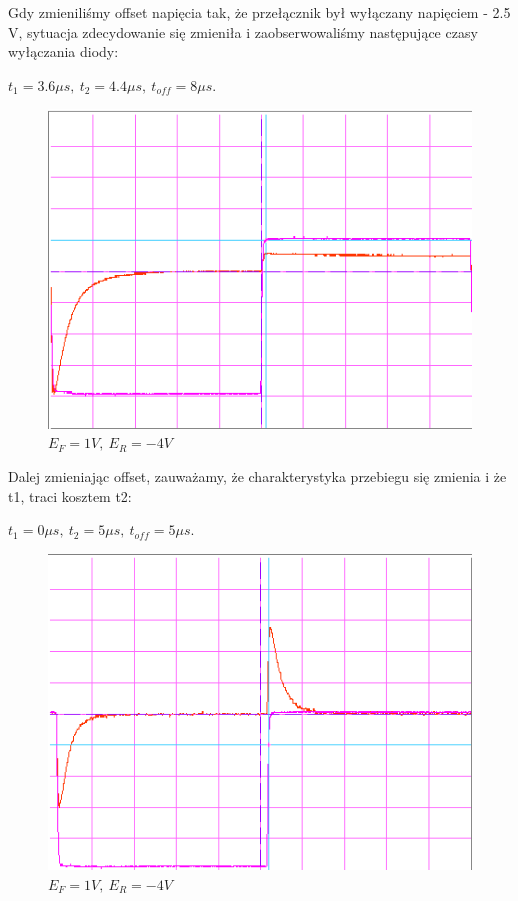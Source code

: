 \documentclass[a4paper,11pt]{article}
\begin{document}
Gdy zmieniliśmy offset napięcia tak, że przełącznik był wyłączany napięciem - 2.5 V, sytuacja zdecydowanie się zmieniła i zaobserwowaliśmy następujące czasy wyłączania diody:

 \(t_1 = 3.6 \mu s,\ t_2 = 4.4 \mu s,\ t_{off} = 8 \mu s \).

\begin{figure} [H]
  \begin{center}
    \includegraphics{../Obrazki_i_tekst/obrobione/1csciety.png}
    \caption{\( E_F = 1V, \ E_R = -4 V\)}
  \end{center}
\end{figure}

Dalej zmieniając offset, zauważamy, że charakterystyka przebiegu się zmienia i że t1, traci kosztem t2:

 \(t_1 = 0 \mu s,\ t_2 = 5 \mu s,\ t_{off} = 5 \mu s \).

\begin{figure} [H]
  \begin{center}
    \includegraphics{../Obrazki_i_tekst/obrobione/1dsciety.png}
    \caption{\( E_F = 1V, \ E_R = -4 V\)}
  \end{center}
\end{figure}
\end{document}
